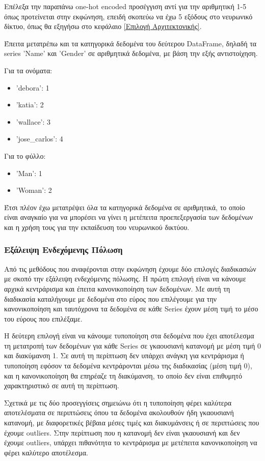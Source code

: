 \documentclass[12pt,a4paper]{article}
\begin{document}
Επέλεξα την παραπάνω one-hot encoded προσέγγιση αντί για την αριθμητική 1-5 όπως προτείνεται στην εκφώνηση, επειδή σκοπεύω να έχω 5 εξόδους στο νευρωνικό δίκτυο, όπως θα εξηγήσω στο κεφάλαιο \ref{Επιλογή Αρχιτεκτονικής}.

Έπειτα μετατρέπω και τα κατηγορικά δεδομένα του δεύτερου DataFrame, δηλαδή τα series 'Name' και 
'Gender' σε αριθμητικά δεδομένα, με βάση την εξής αντιστοίχηση.

Για τα ονόματα:
\begin{itemize}
    \item 'debora': 1
    \item 'katia': 2
    \item 'wallace': 3
    \item 'jose\_carlos': 4
\end{itemize}
Για το φύλλο:
\begin{itemize}
    \item 'Man': 1
    \item 'Woman': 2
\end{itemize}

Έτσι πλέον έχω μετατρέψει όλα τα κατηγορικά δεδομένα σε αριθμητικά, το οποίο είναι αναγκαίο για να μπορέσει να γίνει η μετέπειτα προεπεξεργασία των δεδομένων και η χρήση τους για την εκπαίδευση του νευρωνικού δικτύου.

\subsubsection{Εξάλειψη Ενδεχόμενης Πόλωση}

Από τις μεθόδους που αναφέρονται στην εκφώνηση έχουμε δύο επιλογές διαδικασιών με σκοπό την εξάλειψη ενδεχόμενης πόλωσης. Η πρώτη επιλογή είναι να κάνουμε αρχικά κεντράρισμα και έπειτα κανονικοποίηση των δεδομένων. Με αυτή τη διαδικασία καταλήγουμε με δεδομένα στο εύρος που επιλέγουμε για την κανονικοποίηση και ταυτόχρονα τα δεδομένα σε κάθε Series έχουν μέση τιμή το μέσο του εύρους που επιλέξαμε. 

Η δεύτερη επιλογή είναι να κάνουμε τυποποίηση στα δεδομένα που έχει αποτέλεσμα τη μετατροπή των δεδομένων για κάθε Series σε γκαουσιανή κατανομή με μέση τιμή 0 και διακύμανση 1. Σε αυτή τη περίπτωση δεν υπάρχει ανάγκη για κεντράρισμα ή τυποποίηση εφόσον τα δεδομένα κεντράρονται μέσω της διαδικασίας (μέση τιμή 0), και η κανονικοποίηση θα επηρέαζε τη διακύμανση, το οποίο δεν είναι επιθυμητό χαρακτηριστικό σε αυτή τη περίπτωση. 

Σχετικά με τις δύο προσεγγίσεις σημειώνω ότι η τυποποίηση φέρει καλύτερα αποτελέσματα σε περιπτώσεις όπου τα δεδομένα ακολουθούν ήδη γκαουσιανή κατανομή, με διαφορετικές βέβαια μέσες τιμές και διακυμάνσεις ή σε περιπτώσεις που έχουμε outliers. Στην περίπτωση που η κατανομή δεν είναι γκαουσιανή και δεν έχουμε outliers, υπάρχει πιθανότητα το κεντράρισμα με μετέπειτα κανονικοποίηση να φέρει καλύτερο αποτέλεσμα.
\end{document}
